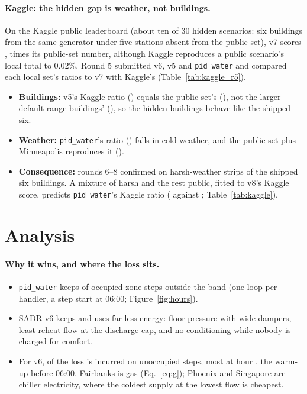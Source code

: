 \documentclass{article}
\begin{document}


\paragraph{Kaggle: the hidden gap is weather, not buildings.} On the Kaggle public leaderboard (about ten of 30 hidden scenarios: six buildings from the same generator under five stations absent from the public set), v7 scores \RFiveKagVSeven, \RFiveKagGapPub{} times its public-set number, although Kaggle reproduces a public scenario's local total to 0.02\%. Round 5 submitted v6, v5 and \texttt{pid\_water} and compared each local set's ratios to v7 with Kaggle's (Table~\ref{tab:kaggle_r5}).
\begin{itemize}
\item \textbf{Buildings:} v5's Kaggle ratio (\RFiveKagRatioVFive) equals the public set's (\RFivePubRatioVFive), not the larger default-range buildings' (\RFiveOldRatioVFive), so the hidden buildings behave like the shipped six.
\item \textbf{Weather:} \texttt{pid\_water}'s ratio (\RFiveKagRatioPid) falls in cold weather, and the public set plus Minneapolis reproduces it (\RFivePubMinnRatioPid).
\item \textbf{Consequence:} rounds 6--8 confirmed on harsh-weather strips of the shipped six buildings. A mixture of \RSixMixWPct{} harsh and the rest public, fitted to v8's Kaggle score, predicts \texttt{pid\_water}'s Kaggle ratio (\RSixMixPid{} against \RSixKagRatioPid; Table~\ref{tab:kaggle}).
\end{itemize}

\section{Analysis}
\label{sec:analysis}

\paragraph{Why it wins, and where the loss sits.}
\begin{itemize}
\item \texttt{pid\_water} keeps \OccOutPidWater{} of occupied zone-steps outside the band (one loop per handler, a step start at 06:00; Figure~\ref{fig:hours}).
\item SADR v6 keeps \OccOutOurs{} and uses far less energy: floor pressure with wide dampers, least reheat flow at the discharge cap, and no conditioning while nobody is charged for comfort.
\item For v6, \UnoccShareOurs{} of the loss is incurred on unoccupied steps, most at hour \PeakLossHourOurs{}, the warm-up before 06:00. Fairbanks is gas (Eq.~\ref{eq:g}); Phoenix and Singapore are chiller electricity, where the coldest supply at the lowest flow is cheapest.
\end{itemize}
\end{document}
